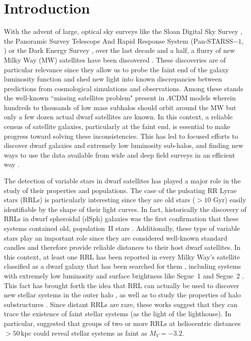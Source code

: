 \documentclass[iop]{emulateapj}
\begin{document}
\section{Introduction}
With the advent of large, optical sky surveys like the Sloan Digital Sky Survey \citep[SDSS;][]{York2000a}, the Panoramic Survey Telescope And Rapid Response System (Pan-STARSS$-1$, \citealt{chambers16a}) or the Dark Energy Survey \citep[DES;][]{abbott15}, over the last decade and a half, a flurry of new Milky Way (MW) satellites have been discovered \citep[e.g.,][]{willman05a, belokurov06a, belokurov06b,belokurov08a, belokurov10a,zucker06a, zucker06b,irwin07a,bechtol15a,koposov15a,drlica15,drlica16,martin15}.
These discoveries are of particular relevance since they allow us to probe the faint end of the galaxy luminosity function and shed new light into known discrepancies between predictions from cosmological simulations and observations.
Among these stands the well-known ``missing satellites problem" present in $\Lambda$CDM models \citep[e.g.,][]{Kauffmann1993, klypin99a, Moore1999, Simon2007} wherein hundreds to thousands of low mass subhalos should orbit around the MW but only a few dozen actual dwarf satellites are known.
In this context, a reliable census of satellite galaxies, particularly at the faint end, is essential to make progress toward solving these inconsistencies.
This has led to focused efforts to discover dwarf galaxies and extremely low  luminosity sub-halos, and finding new ways to use the data available from wide and deep field surveys in an efficient way \citep[e.g.,][]{bechtol15a,koposov15a,Baker2015}.

The detection of variable stars in dwarf satellites has played a major role in the study of their properties and populations. 
The case of the pulsating RR Lyrae stars (RRLs) is particularly interesting since they are old stars ($>10$ Gyr) easily identifiable by the shape of their light curves. 
In fact, historically the discovery of RRLs in dwarf spheroidal (dSph) galaxies was the first confirmation that these systems contained old, population~II stars \citep[e.g.,][]{baade39a, saha86a, siegel06a}. 
Additionally, these type of variable stars play an important role since they are considered well-known standard candles and therefore provide reliable distances to their host dwarf satellites.
In this context, at least one RRL has been reported in every Milky Way's satellite classified as a dwarf galaxy that has been searched for them \citep[see compilation in][]{Vivas2016}, including systems with extremely low luminosity and surface brightness like Segue~1 \citep{Simon11a} and Segue~2 \citep{Boettcher13a}. 
This fact has brought forth the idea that RRL can actually be used to discover new stellar systems in the outer halo \citep{Sesar2014,Baker2015,Sanderson2016}, as well as to study the properties of halo substructures \citep{Vivas2001,Sesar2013,Dra13_100kpc,Torrealba2015}.
Since distant RRLs are rare, these works suggest that they can trace the existence of faint stellar systems (as the light of the lighthouse). 
In particular, \citet{Baker2015} suggested that groups of two or more RRLs at heliocentric distances $>50$\,kpc could reveal stellar systems as faint as $M_V=-3.2$.
\end{document}
